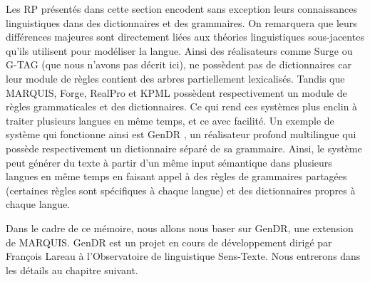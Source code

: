 Les RP présentés dans cette section encodent sans exception leurs connaissances linguistiques dans des dictionnaires et des grammaires. On remarquera que leurs différences majeures sont directement liées aux théories linguistiques sous-jacentes qu'ils utilisent pour modéliser la langue. Ainsi des réalisateurs comme Surge ou G-TAG (que nous n'avons pas décrit ici), ne possèdent pas de dictionnaires car leur module de règles contient des arbres partiellement lexicalisés. Tandis que MARQUIS, Forge, RealPro et KPML possèdent respectivement un module de règles grammaticales et des dictionnaires. Ce qui rend ces systèmes plus enclin à traiter plusieurs langues en même temps, et ce avec facilité. Un exemple de système qui fonctionne ainsi est GenDR \citep{lareau18}, un réalisateur profond multilingue qui possède respectivement un dictionnaire séparé de sa grammaire. Ainsi, le système peut générer du texte à partir d'un même input sémantique dans plusieurs langues en même temps en faisant appel à des règles de grammaires partagées (certaines règles sont spécifiques à chaque langue) et des dictionnaires propres à chaque langue.

Dans le cadre de ce mémoire, nous allons nous baser sur GenDR, une extension de MARQUIS. GenDR est un projet en cours de développement dirigé par François Lareau à l’Observatoire de linguistique Sens-Texte. Nous entrerons dans les détails au chapitre suivant.